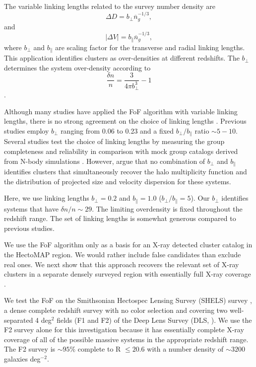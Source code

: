\documentclass[iop, apj]{emulateapj}
\begin{document}
The variable linking lengths related to the survey number density are 
\begin{equation}
 \Delta D  = b_{\bot} \overline{n}_{g}^{-1/3},
\end{equation}
and
\begin{equation}
|\Delta V| = b_{\|} \overline{n}_{g}^{-1/3},
\end{equation}
 where $b_{\bot}$ and $b_{\|}$ are scaling factor for the transverse and radial linking lengths. 
This application identifies clusters as over-densities at different redshifts. 
The $b_{\bot}$ determines the system over-density according to
\begin{equation}
\frac{\delta n}{n} = \frac{3}{4 \pi b_{\bot}^3} - 1
\end{equation}
\citep{Huchra82, Geller83, Diaferio99a, Duarte14}. 

Although many studies have applied the FoF algorithm with variable linking lengths, 
 there is no strong agreement on the choice of linking lengths \citep{Duarte14}. 
Previous studies employ $b_{\bot}$ ranging from 0.06 to 0.23 and 
 a fixed $b_{\bot}/b_{\|}$ ratio $\sim5 - 10$. 
Several studies test the choice of linking lengths 
 by measuring the group completeness and reliability in
 comparison with mock group catalogs derived from N-body simulations
 \citep{Frederic95, Merchan02, Eke04, Berlind06, Robotham11}. 
However, 
 \citet{Berlind06} argue that no combination of $b_{\bot}$ and $b_{\|}$ 
 identifies clusters that simultaneously recover
 the halo multiplicity function and 
 the distribution of projected size and velocity dispersion for these systems. 

Here, we use linking lengths 
 $b_{\bot} = 0.2$ and $b_{\|} = 1.0$ ($b_{\bot} / b_{\|} = 5$). 
Our $b_{\bot}$ identifies systems 
 that have $\delta n/n \sim 29$. 
The limiting overdensity is fixed throughout the redshift range.
The set of linking lengths is somewhat generous compared to previous studies.  

We use the FoF algorithm only
 as a basis for an X-ray detected cluster catalog in the HectoMAP region.
We would rather include false candidates than exclude real ones.
We next show that this approach recovers the relevant set of X-ray clusters
 in a separate densely surveyed region with essentially full X-ray coverage \citep{Starikova14}. 

We test the FoF on the Smithsonian Hectospec Lensing Survey (SHELS) survey \citep{Geller10, Geller12, Geller14, Geller16}, 
 a dense complete redshift survey with no color selection and 
 covering two well-separated 4 deg$^{2}$ fields (F1 and F2) of the Deep Lens Survey (DLS, \citealp{Wittman02}). 
We use the F2 survey alone for this investigation 
 because it has essentially complete X-ray coverage of all of the possible massive systems 
 in the appropriate redshift range.
The F2 survey is $\sim95\%$ complete to R $\leq 20.6$ with a number density of $\sim 3200$ galaxies deg$^{-2}$.
\end{document}
